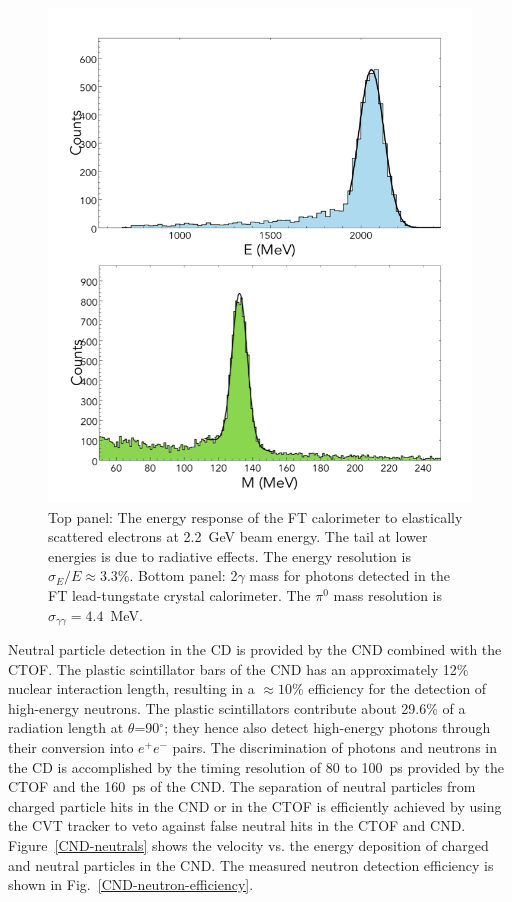 \documentclass[final,3p,twocolumn]{elsarticle}
\begin{document}
\begin{figure}[tp!]
\centerline{\includegraphics[width=1.15\columnwidth]{FT-performance.png}}
\caption{Top panel: The energy response of the FT calorimeter to elastically scattered electrons at 2.2~GeV
  beam energy. The tail at lower energies is due to radiative effects. The energy resolution is
  $\sigma_E / E \approx 3.3\%$. Bottom panel: 2$\gamma$ mass for photons detected in the FT lead-tungstate
  crystal calorimeter. The $\pi^0$ mass resolution is $\sigma_{\gamma\gamma} = 4.4$~MeV.}
\label{FT-en-gg}
\end{figure}

Neutral particle detection in the CD is provided by the CND combined with the CTOF. The plastic scintillator bars
of the CND has an approximately 12\% nuclear interaction length, resulting in a $\approx 10\%$ efficiency for
the detection of high-energy neutrons. The plastic scintillators contribute about 29.6\% of a radiation length at
$\theta$=90$^\circ$; they hence also detect high-energy photons through their conversion into $e^+e^-$ pairs. The
discrimination of photons and neutrons in the CD is accomplished by the timing resolution of 80 to 100~ps provided by the
CTOF and the 160~ps of the CND. The separation of neutral particles from charged particle hits in the CND or in
the CTOF is efficiently achieved by using the CVT tracker to veto against false neutral hits in the CTOF and CND.
Figure~\ref{CND-neutrals} shows the velocity vs. the energy deposition of charged and neutral particles in the
CND. The measured neutron detection efficiency is shown in Fig.~\ref{CND-neutron-efficiency}.
\end{document}
